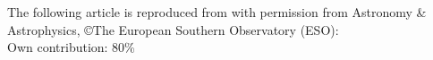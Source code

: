 \newpage

The following article is reproduced from \textcite{Forstner-2020-SolO} with permission from Astronomy \& Astrophysics, \copyright The European Southern Observatory (ESO):\\

\hfill Own contribution: 80\%

\newpage
{}

